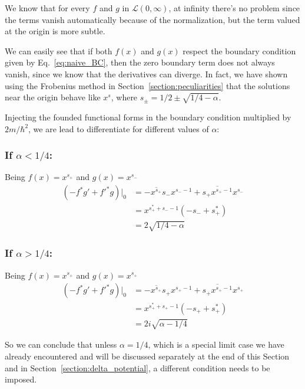 \noindent
We know that for every $f$ and $g$ in $\mathcal{L}(0,\infty)$, at infinity there's no problem since the terms vanish automatically because of the normalization, but the term valued at the origin is more subtle.

We  can easily see that if both $f(x)$ and $g(x)$ respect the boundary condition given by Eq.~\eqref{eq:naive_BC}, then the zero boundary term does not always vanish, since we know that the derivatives can diverge.
In fact, we have shown using the Frobenius method in Section~\ref{section:peculiarities} that the solutions near the origin behave like $x^s$, where $s_\pm = 1/2 \pm \sqrt{1/4 - \alpha}$.

Injecting the founded functional forms in the boundary condition multiplied by $2m/\hbar^2$, we are lead to differentiate for different values of $\alpha$:
\subsubsection*{If $\alpha < 1/4$:} 
Being $f(x) = x^{s_+}$ and $g(x) = x^{s_-}$
\begin{align*}
    (- f^* g' + f'^* g)\bigg|_0
     & = - \overline{x^{s_+}} s_- x^{s_- -1} + \overline{s_+ x^{s_+-1}} x^{s_-} \\
     & = x^{s_+^* + s_- -1}(- s_- + s_+^*)                                      \\
     & = 2 \sqrt{1/4 - \alpha}
\end{align*}

\subsubsection*{If $\alpha > 1/4$:}
 Being $f(x) = x^{s_+}$ and $g(x) = x^{s_+}$
\begin{align*}
    (- f^* g' + f'^* g)\bigg|_0
     & = - \overline{x^{s_+}} s_+ x^{s_+ -1} + \overline{s_+ x^{s_+-1}} x^{s_+} \\
     & = x^{s_+^* + s_+ -1}(- s_+ + s_+^*)                                      \\
     & = 2i \sqrt{\alpha-1/4}
\end{align*}

\vspace{4mm}
\noindent
So we can conclude that unless $\alpha = 1/4$, which is a special limit case we have already encountered and will be discussed separately at the end of this Section and in Section~\ref{section:delta_potential}, a different condition needs to be imposed.

